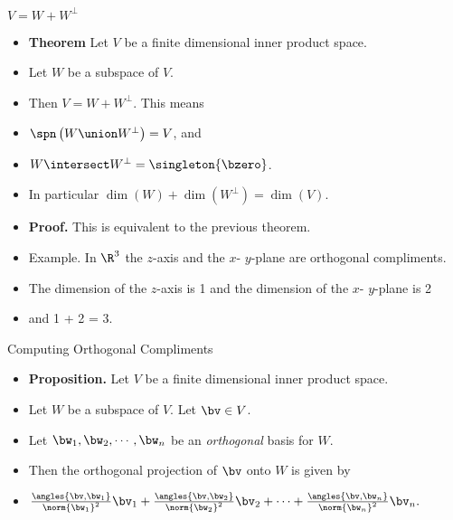\documentclass{beamer}
\begin{document}
\begin{frame}{$V=W+W^{\perp}$}
\begin{itemize}
\item \textbf{Theorem} Let $V$ be a finite dimensional inner product space.
\item Let $W$ be a subspace of $V$.
\item Then $V= W + W^{\perp}$. This means
\item $\spn\left(W\union W^{\perp}\right) = V$, and
\item $W\intersect W^{\perp} = \singleton{\bzero}$.
\item In particular $\dim(W) + \dim(W^{\perp}) = \dim(V)$.
\item \textbf{Proof.} This is equivalent to the previous theorem.
\item Example. In $\R^3$ the $z$-axis and the $x$- $y$-plane are orthogonal compliments.
\item The dimension of the $z$-axis is 1 and the dimension of the $x$- $y$-plane is 2
\item and 1 + 2 = 3.
\end{itemize}
\end{frame}

\begin{frame}{Computing Orthogonal Compliments}
\begin{itemize}
\item \textbf{Proposition.} Let $V$ be a finite dimensional inner product space.
\item Let $W$ be a subspace of $V$. Let $\bv\in V$.
\item Let $\bw_1,\bw_2,\cdots,\bw_n$ be an \emph{orthogonal} basis for $W$.
\item Then the orthogonal projection of $\bv$ onto $W$ is given by
\item $\frac{\angles{\bv,\bw_1}}{\norm{\bw_1}^2}\bv_1 + \frac{\angles{\bv,\bw_2}}{\norm{\bw_2}^2}\bv_2+\cdots+\frac{\angles{\bv,\bw_n}}{\norm{\bw_n}^2}\bv_n.$
\end{itemize}
\end{frame}
\end{document}
